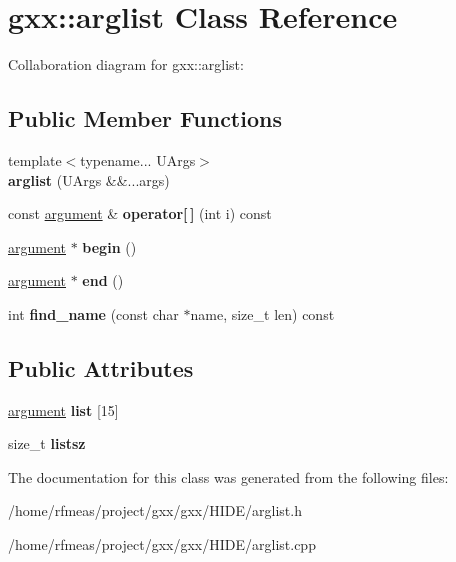 \hypertarget{classgxx_1_1arglist}{}\section{gxx\+:\+:arglist Class Reference}
\label{classgxx_1_1arglist}


Collaboration diagram for gxx\+:\+:arglist\+:
\subsection*{Public Member Functions}
\begin{DoxyCompactItemize}
\item 
{\footnotesize template$<$typename... U\+Args$>$ }\\{\bfseries arglist} (U\+Args \&\&...args)\hypertarget{classgxx_1_1arglist_aec50946505f2a8258dff24e8ecb5ea50}{}\label{classgxx_1_1arglist_aec50946505f2a8258dff24e8ecb5ea50}

\item 
const \hyperlink{structgxx_1_1argument}{argument} \& {\bfseries operator\mbox{[}$\,$\mbox{]}} (int i) const \hypertarget{classgxx_1_1arglist_a6d5a62f369976094f60133c6c36c1f1d}{}\label{classgxx_1_1arglist_a6d5a62f369976094f60133c6c36c1f1d}

\item 
\hyperlink{structgxx_1_1argument}{argument} $\ast$ {\bfseries begin} ()\hypertarget{classgxx_1_1arglist_abbde7d4924c0ec1dc88ee050a63c6c04}{}\label{classgxx_1_1arglist_abbde7d4924c0ec1dc88ee050a63c6c04}

\item 
\hyperlink{structgxx_1_1argument}{argument} $\ast$ {\bfseries end} ()\hypertarget{classgxx_1_1arglist_ac58fdac6e49f8436db52e161f65eb97a}{}\label{classgxx_1_1arglist_ac58fdac6e49f8436db52e161f65eb97a}

\item 
int {\bfseries find\+\_\+name} (const char $\ast$name, size\+\_\+t len) const \hypertarget{classgxx_1_1arglist_acbbf22df9ba8ee8e4fd461d0c7357700}{}\label{classgxx_1_1arglist_acbbf22df9ba8ee8e4fd461d0c7357700}

\end{DoxyCompactItemize}
\subsection*{Public Attributes}
\begin{DoxyCompactItemize}
\item 
\hyperlink{structgxx_1_1argument}{argument} {\bfseries list} \mbox{[}15\mbox{]}\hypertarget{classgxx_1_1arglist_abb42300bed2be83c7498299a602f38a6}{}\label{classgxx_1_1arglist_abb42300bed2be83c7498299a602f38a6}

\item 
size\+\_\+t {\bfseries listsz}\hypertarget{classgxx_1_1arglist_aa1d072acb37922a83edf8c2145b64c89}{}\label{classgxx_1_1arglist_aa1d072acb37922a83edf8c2145b64c89}

\end{DoxyCompactItemize}


The documentation for this class was generated from the following files\+:\begin{DoxyCompactItemize}
\item 
/home/rfmeas/project/gxx/gxx/\+H\+I\+D\+E/arglist.\+h\item 
/home/rfmeas/project/gxx/gxx/\+H\+I\+D\+E/arglist.\+cpp\end{DoxyCompactItemize}

